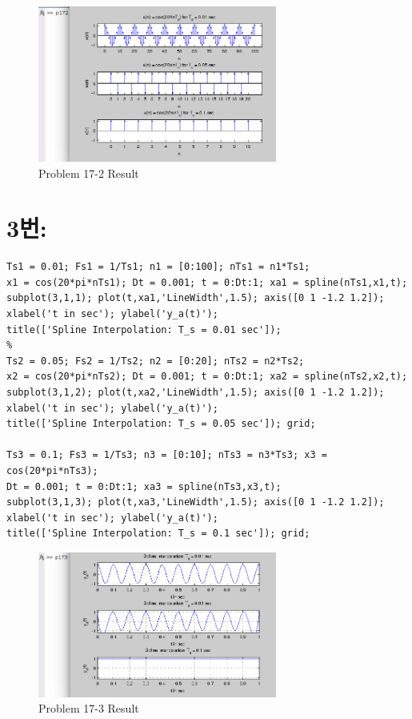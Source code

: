 \documentclass[11pt
  , a4paper
  , article
  , oneside
]{memoir}
\begin{document}
\begin{figure}[h!]
	\centering
	\includegraphics[width=0.7\textwidth,height=0.4\textwidth]{./images/p17-2.png}
	\caption{Problem 17-2 Result}
	\label{fig:Problem 17-2 Result}
\end{figure}

\section{3번: }
\begin{lstlisting}[style=termstyle]
%Problem 3.17-3
Ts1 = 0.01; Fs1 = 1/Ts1; n1 = [0:100]; nTs1 = n1*Ts1;
x1 = cos(20*pi*nTs1); Dt = 0.001; t = 0:Dt:1; xa1 = spline(nTs1,x1,t);
subplot(3,1,1); plot(t,xa1,'LineWidth',1.5); axis([0 1 -1.2 1.2]);
xlabel('t in sec'); ylabel('y_a(t)');
title(['Spline Interpolation: T_s = 0.01 sec']);
%
Ts2 = 0.05; Fs2 = 1/Ts2; n2 = [0:20]; nTs2 = n2*Ts2;
x2 = cos(20*pi*nTs2); Dt = 0.001; t = 0:Dt:1; xa2 = spline(nTs2,x2,t);
subplot(3,1,2); plot(t,xa2,'LineWidth',1.5); axis([0 1 -1.2 1.2]);
xlabel('t in sec'); ylabel('y_a(t)');
title(['Spline Interpolation: T_s = 0.05 sec']); grid;

Ts3 = 0.1; Fs3 = 1/Ts3; n3 = [0:10]; nTs3 = n3*Ts3; x3 = cos(20*pi*nTs3);
Dt = 0.001; t = 0:Dt:1; xa3 = spline(nTs3,x3,t);
subplot(3,1,3); plot(t,xa3,'LineWidth',1.5); axis([0 1 -1.2 1.2]);
xlabel('t in sec'); ylabel('y_a(t)');
title(['Spline Interpolation: T_s = 0.1 sec']); grid;
\end{lstlisting}

\begin{figure}[h!]
	\centering
	\includegraphics[width=0.7\textwidth,height=0.4\textwidth]{./images/p17-3.png}
	\caption{Problem 17-3 Result}
	\label{fig:Problem 17-3 Result}
\end{figure}
\end{document}
